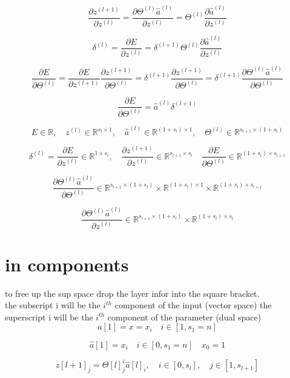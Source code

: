 \documentclass[12pt,a4paper]{article}
\begin{document}
\[
\frac{\partial z^{(l+1)}}{\partial z^{(l)}} = \frac{\partial \Theta^{(l)}\hat{a}^{(l)}}{\partial z^{(l)}} = \Theta^{(l)}\frac{\partial \hat{a}^{(l)}}{\partial z^{(l)}}
\]

\[
\delta^{(l)} = 
\frac{\partial E}{\partial z^{(l)}}  =\delta^{(l+1)}\Theta^{(l)}\frac{\partial \hat{a}^{(l)}}{\partial z^{(l)}}
\]

\[
\frac{\partial E}{\partial \Theta^{(l)}} = \frac{\partial E}{\partial  z^{(l+1)}}\frac{\partial z^{(l+1)}}{\partial \Theta^{(l)}} = \delta^{(l+1)}\frac{\partial z^{(l+1)}}{\partial  \Theta^{(l)}} = \delta^{(l+1)}\frac{\partial \Theta^{(l)}\hat{a}^{(l)}}{\partial  \Theta^{(l)}}
\]

\[
\frac{\partial E}{\partial \Theta^{(l)}} = \hat{a}^{(l)}\delta^{(l+1)}
\]

\[
E \in \mathbb{R}, \quad z^{(l)} \in \mathbb{R}^{s_l \times 1},\quad \hat{a}^{(l)} \in \mathbb{R}^{(1+s_l) \times 1}, \quad  \Theta^{(l)} \in \mathbb{R}^{s_{l+1} \times (1+s_{l})}
\]

\[
\delta^{(l)} = \frac{\partial E}{\partial z^{(l)}}  \in \mathbb{R}^{1 \times s_l}, \quad
\frac{\partial z^{(l+1)}}{\partial z^{(l)}} \in  \mathbb{R}^{s_{l+1} \times s_l} \quad
\frac{\partial E}{\partial \Theta^{(l)}}  \in \mathbb{R}^{(1 + s_{l}) \times s_{l+1}}
\]


\[
\frac{\partial \Theta^{(l)}\hat{a}^{(l)}}{\partial  \Theta^{(l)}} \in  \mathbb{R}^{s_{l+1}\times (1 + s_{l}) }\times \mathbb{R}^{(1+s_l) \times 1} \times \mathbb{R}^{(1 + s_{l}) \times s_{l+1}}
\]


\[
\frac{\partial \Theta^{(l)}\hat{a}^{(l)}}{\partial z^{(l)}} \in \mathbb{R}^{s_{l+1} \times (1+s_{l})}\times \mathbb{R}^{(1 + s_{l}) \times s_{l}}
\]



\section{in components}
to free up the sup space drop the layer infor into the square bracket.\\
the subscript i will be the $i^{th}$ component of the input (vector space)
the superscript i will be the $i^{th}$ component of the parameter (dual space)
\[
a[1] = x = x_i  \quad i \in [1,s_1=n]
\]

\[
\hat{a}[1] = x_i  \quad i \in [0,s_1=n] \quad x_0 = 1
\]


\[
z[l+1]_{j} = \Theta[l]^{i}_{j}\hat{a}[l]_{i}, \quad i \in [0,s_l], \quad j \in [1,s_{l+1}]
\]
\end{document}
